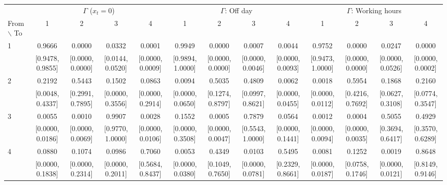 \begin{table}[ht]
\centering
\begin{adjustbox}{max width=\textwidth}
\begin{tabular}{lcccc|cccc|cccc}
\hline
 & \multicolumn{4}{c}{$\Gamma$ ($x_t = 0$)} & \multicolumn{4}{c}{$\Gamma$: Off day} & \multicolumn{4}{c}{$\Gamma$: Working hours} \\
\cmidrule(lr){2-5} \cmidrule(lr){6-9} \cmidrule(lr){10-13}
From $\backslash$ To & 1 & 2 & 3 & 4 & 1 & 2 & 3 & 4 & 1 & 2 & 3 & 4 \\
\hline
1 & 0.9666 & 0.0000 & 0.0332 & 0.0001 & 0.9949 & 0.0000 & 0.0007 & 0.0044 & 0.9752 & 0.0000 & 0.0247 & 0.0000 \\
 & {\footnotesize [0.9478, 0.9855]} & {\footnotesize [0.0000, 0.0000]} & {\footnotesize [0.0144, 0.0520]} & {\footnotesize [0.0000, 0.0009]} & {\footnotesize [0.9894, 1.0000]} & {\footnotesize [0.0000, 0.0000]} & {\footnotesize [0.0000, 0.0046]} & {\footnotesize [0.0000, 0.0093]} & {\footnotesize [0.9473, 1.0000]} & {\footnotesize [0.0000, 0.0000]} & {\footnotesize [0.0000, 0.0526]} & {\footnotesize [0.0000, 0.0002]} \\
2 & 0.2192 & 0.5443 & 0.1502 & 0.0863 & 0.0094 & 0.5035 & 0.4809 & 0.0062 & 0.0018 & 0.5954 & 0.1868 & 0.2160 \\
 & {\footnotesize [0.0048, 0.4337]} & {\footnotesize [0.2991, 0.7895]} & {\footnotesize [0.0000, 0.3556]} & {\footnotesize [0.0000, 0.2914]} & {\footnotesize [0.0000, 0.0650]} & {\footnotesize [0.1274, 0.8797]} & {\footnotesize [0.0997, 0.8621]} & {\footnotesize [0.0000, 0.0455]} & {\footnotesize [0.0000, 0.0112]} & {\footnotesize [0.4216, 0.7692]} & {\footnotesize [0.0627, 0.3108]} & {\footnotesize [0.0774, 0.3547]} \\
3 & 0.0055 & 0.0010 & 0.9907 & 0.0028 & 0.1552 & 0.0005 & 0.7879 & 0.0564 & 0.0012 & 0.0004 & 0.5055 & 0.4929 \\
 & {\footnotesize [0.0000, 0.0186]} & {\footnotesize [0.0000, 0.0069]} & {\footnotesize [0.9770, 1.0000]} & {\footnotesize [0.0000, 0.0106]} & {\footnotesize [0.0000, 0.3508]} & {\footnotesize [0.0000, 0.0047]} & {\footnotesize [0.5543, 1.0000]} & {\footnotesize [0.0000, 0.1441]} & {\footnotesize [0.0000, 0.0094]} & {\footnotesize [0.0000, 0.0035]} & {\footnotesize [0.3694, 0.6417]} & {\footnotesize [0.3570, 0.6289]} \\
4 & 0.0880 & 0.1074 & 0.0986 & 0.7060 & 0.0053 & 0.4349 & 0.0103 & 0.5495 & 0.0081 & 0.1252 & 0.0019 & 0.8648 \\
 & {\footnotesize [0.0000, 0.1838]} & {\footnotesize [0.0000, 0.2314]} & {\footnotesize [0.0000, 0.2011]} & {\footnotesize [0.5684, 0.8437]} & {\footnotesize [0.0000, 0.0380]} & {\footnotesize [0.1049, 0.7650]} & {\footnotesize [0.0000, 0.0781]} & {\footnotesize [0.2329, 0.8661]} & {\footnotesize [0.0000, 0.0187]} & {\footnotesize [0.0758, 0.1746]} & {\footnotesize [0.0000, 0.0121]} & {\footnotesize [0.8149, 0.9146]} \\

\end{tabular}
\end{adjustbox}
\end{table}
